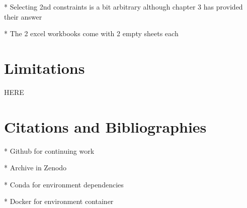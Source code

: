\documentclass[acmtog]{acmart}
\begin{document}
* Selecting 2nd constraints is a bit arbitrary although chapter 3 has provided their answer

* The 2 excel workbooks come with 2 empty sheets each

\section{Limitations}
HERE

\section{Citations and Bibliographies}
* Github for continuing work

* Archive in Zenodo

* Conda for environment dependencies

* Docker for environment container
\end{document}

